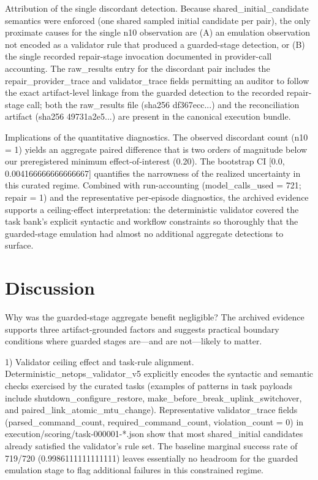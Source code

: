 \documentclass[conference]{IEEEtran}
\begin{document}
Attribution of the single discordant detection. Because shared\_initial\_candidate semantics were enforced (one shared sampled initial candidate per pair), the only proximate causes for the single n10 observation are (A) an emulation observation not encoded as a validator rule that produced a guarded-stage detection, or (B) the single recorded repair-stage invocation documented in provider-call accounting. The raw\_results entry for the discordant pair includes the repair\_provider\_trace and validator\_trace fields permitting an auditor to follow the exact artifact-level linkage from the guarded detection to the recorded repair-stage call; both the raw\_results file (sha256 df367ecc...) and the reconciliation artifact (sha256 49731a2e5...) are present in the canonical execution bundle.

Implications of the quantitative diagnostics. The observed discordant count (n10 = 1) yields an aggregate paired difference that is two orders of magnitude below our preregistered minimum effect-of-interest (0.20). The bootstrap CI [0.0, 0.004166666666666667] quantifies the narrowness of the realized uncertainty in this curated regime. Combined with run-accounting (model\_calls\_used = 721; repair = 1) and the representative per-episode diagnostics, the archived evidence supports a ceiling-effect interpretation: the deterministic validator covered the task bank's explicit syntactic and workflow constraints so thoroughly that the guarded-stage emulation had almost no additional aggregate detections to surface.

\section{Discussion}
Why was the guarded-stage aggregate benefit negligible? The archived evidence supports three artifact-grounded factors and suggests practical boundary conditions where guarded stages are---and are not---likely to matter.

1) Validator ceiling effect and task-rule alignment. Deterministic\_netops\_validator\_v5 explicitly encodes the syntactic and semantic checks exercised by the curated tasks (examples of patterns in task payloads include shutdown\_configure\_restore, make\_before\_break\_uplink\_switchover, and paired\_link\_atomic\_mtu\_change). Representative validator\_trace fields (parsed\_command\_count, required\_command\_count, violation\_count = 0) in execution/scoring/task-000001-*.json show that most shared\_initial candidates already satisfied the validator's rule set. The baseline marginal success rate of 719/720 (0.9986111111111111) leaves essentially no headroom for the guarded emulation stage to flag additional failures in this constrained regime.
\end{document}
